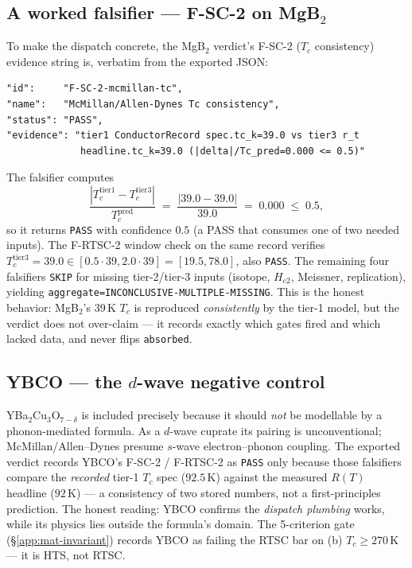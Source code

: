\subsection{A worked falsifier --- F-SC-2 on MgB$_2$}
\label{app:mat-worked}

To make the dispatch concrete, the MgB$_2$ verdict's F-SC-2 ($T_c$
consistency) evidence string is, verbatim from the exported JSON:
\begin{lstlisting}
"id":     "F-SC-2-mcmillan-tc",
"name":   "McMillan/Allen-Dynes Tc consistency",
"status": "PASS",
"evidence": "tier1 ConductorRecord spec.tc_k=39.0 vs tier3 r_t
             headline.tc_k=39.0 (|delta|/Tc_pred=0.000 <= 0.5)"
\end{lstlisting}
The falsifier computes
\begin{equation}
\frac{|T_c^{\text{tier1}} - T_c^{\text{tier3}}|}{T_c^{\text{pred}}}
  \;=\; \frac{|39.0 - 39.0|}{39.0} \;=\; 0.000 \;\le\; 0.5,
\end{equation}
so it returns \texttt{PASS} with confidence $0.5$ (a PASS that consumes one
of two needed inputs). The F-RTSC-2 window check on the same record
verifies $T_c^{\text{tier3}}=39.0\!\in\![0.5\!\cdot\!39, 2.0\!\cdot\!39]
=[19.5, 78.0]$, also \texttt{PASS}. The remaining four falsifiers
\texttt{SKIP} for missing tier-2/tier-3 inputs (isotope, $H_{c2}$,
Meissner, replication), yielding
\texttt{aggregate=INCONCLUSIVE-MULTIPLE-MISSING}. This is the honest
behavior: MgB$_2$'s $39$\,K $T_c$ is reproduced \emph{consistently} by the
tier-1 model, but the verdict does not over-claim --- it records exactly
which gates fired and which lacked data, and never flips
\texttt{absorbed}.

\subsection{YBCO --- the $d$-wave negative control}
\label{app:mat-ybco}

YBa$_2$Cu$_3$O$_{7-\delta}$ is included precisely because it should
\emph{not} be modellable by a phonon-mediated formula. As a $d$-wave
cuprate its pairing is unconventional; McMillan/Allen--Dynes presume
$s$-wave electron--phonon coupling. The exported verdict records YBCO's
F-SC-2 / F-RTSC-2 as \texttt{PASS} only because those falsifiers compare
the \emph{recorded} tier-1 $T_c$ spec ($92.5$\,K) against the measured
$R(T)$ headline ($92$\,K) --- a consistency of two stored numbers, not a
first-principles prediction. The honest reading: YBCO confirms the
\emph{dispatch plumbing} works, while its physics lies outside the
formula's domain. The 5-criterion gate (\S\ref{app:mat-invariant}) records
YBCO as failing the RTSC bar on (b) $T_c\!\ge\!270$\,K --- it is HTS, not
RTSC.

